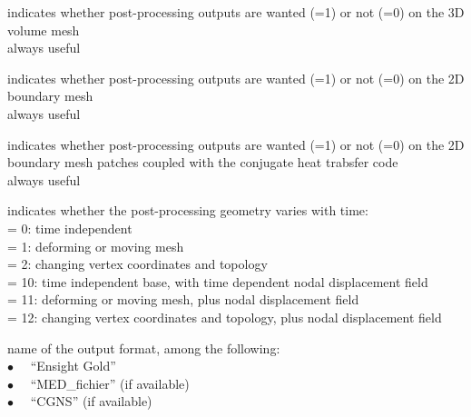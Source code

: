 {indicates whether post-processing outputs are wanted (=1) or not (=0)
on the 3D volume mesh\\
always useful}

{indicates whether post-processing outputs are wanted (=1) or not (=0)
on the 2D boundary mesh\\
always useful}

 {indicates whether post-processing outputs are wanted (=1) or not (=0)
 on the 2D boundary mesh patches coupled with the \syrthes conjugate
 heat trabsfer code\\
 always useful}

 {indicates whether the post-processing geometry varies with time:\\
 \hspace*{1.3cm}= 0: time independent\\
 \hspace*{1.3cm}= 1: deforming or moving mesh\\
 \hspace*{1.3cm}= 2: changing vertex coordinates and topology\\
 \hspace*{1.3cm}= 10: time independent base, with time dependent nodal displacement field\\
 \hspace*{1.3cm}= 11: deforming or moving mesh, plus nodal displacement field\\
 \hspace*{1.3cm}= 12: changing vertex coordinates and topology, plus nodal displacement field}

 {name of the output format, among the following:\\
 \hspace*{1.3cm}$\bullet\quad$ ``Ensight Gold''\\
 \hspace*{1.3cm}$\bullet\quad$ ``MED\_fichier'' (if available)\\
 \hspace*{1.3cm}$\bullet\quad$ ``CGNS'' (if available)}

